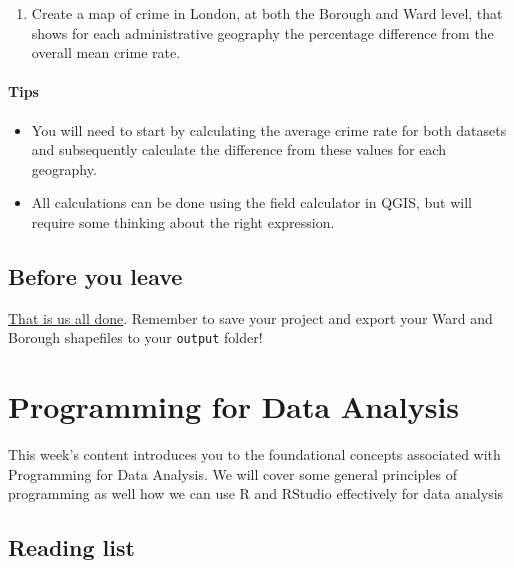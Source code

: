 \documentclass[
]{book}
\providecommand{\tightlist}{%
  \setlength{\itemsep}{0pt}\setlength{\parskip}{0pt}}
\begin{document}
\begin{enumerate}
\def\labelenumi{\arabic{enumi}.}
\setcounter{enumi}{1}
\tightlist
\item
  Create a map of crime in London, at both the Borough and Ward level, that shows for each administrative geography the percentage difference from the overall mean crime rate.
\end{enumerate}

\hypertarget{tips}{%
\subsubsection*{Tips}\label{tips}}

\begin{itemize}
\tightlist
\item
  You will need to start by calculating the average crime rate for both datasets and subsequently calculate the difference from these values for each geography.
\item
  All calculations can be done using the field calculator in QGIS, but will require some thinking about the right expression.
\end{itemize}

\hypertarget{byl-w03}{%
\section{Before you leave}\label{byl-w03}}

\href{https://www.youtube.com/watch?v=3wxyN3z9PL4}{That is us all done}. Remember to save your project and export your Ward and Borough shapefiles to your \texttt{output} folder!

\hypertarget{programming-for-data-analysis}{%
\chapter{Programming for Data Analysis}\label{programming-for-data-analysis}}

This week's content introduces you to the foundational concepts associated with Programming for Data Analysis. We will cover some general principles of programming as well how we can use R and RStudio effectively for data analysis

\hypertarget{reading-w04}{%
\section{Reading list}\label{reading-w04}}
\end{document}
